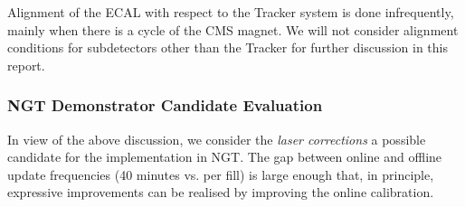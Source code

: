 Alignment of the ECAL with respect to the Tracker system is done infrequently,
mainly when there is a cycle of the CMS magnet.
We will not consider alignment conditions for subdetectors other than the Tracker for further discussion in this report.

\subsubsection{NGT Demonstrator Candidate Evaluation}

In view of the above discussion, we consider the \emph{laser corrections} a possible candidate for the implementation in NGT.
The gap between online and offline update frequencies (40 minutes vs. per fill) is large enough that, in principle, expressive improvements can be realised by improving the online calibration.
